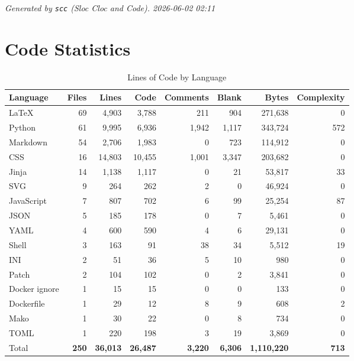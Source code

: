 
\textit{Generated by \texttt{scc} (Sloc Cloc and Code). 2026-06-02 02:11}
\section{Code Statistics}

\begin{table}[H]
  \centering
  \caption{Lines of Code by Language}
  \label{tab:scc-report}
  \begin{tabular}{|l|r|r|r|r|r|r|r|}
    \hline
    \textbf{Language} & \textbf{Files} & \textbf{Lines} & \textbf{Code} & \textbf{Comments} & \textbf{Blank} & \textbf{Bytes} & \textbf{Complexity} \\
    \hline
    LaTeX & 69 & 4,903 & 3,788 & 211 & 904 & 271,638 & 0 \\\hline
    Python & 61 & 9,995 & 6,936 & 1,942 & 1,117 & 343,724 & 572 \\\hline
    Markdown & 54 & 2,706 & 1,983 & 0 & 723 & 114,912 & 0 \\\hline
    CSS & 16 & 14,803 & 10,455 & 1,001 & 3,347 & 203,682 & 0 \\\hline
    Jinja & 14 & 1,138 & 1,117 & 0 & 21 & 53,817 & 33 \\\hline
    SVG & 9 & 264 & 262 & 2 & 0 & 46,924 & 0 \\\hline
    JavaScript & 7 & 807 & 702 & 6 & 99 & 25,254 & 87 \\\hline
    JSON & 5 & 185 & 178 & 0 & 7 & 5,461 & 0 \\\hline
    YAML & 4 & 600 & 590 & 4 & 6 & 29,131 & 0 \\\hline
    Shell & 3 & 163 & 91 & 38 & 34 & 5,512 & 19 \\\hline
    INI & 2 & 51 & 36 & 5 & 10 & 980 & 0 \\\hline
    Patch & 2 & 104 & 102 & 0 & 2 & 3,841 & 0 \\\hline
    Docker ignore & 1 & 15 & 15 & 0 & 0 & 133 & 0 \\\hline
    Dockerfile & 1 & 29 & 12 & 8 & 9 & 608 & 2 \\\hline
    Mako & 1 & 30 & 22 & 0 & 8 & 734 & 0 \\\hline
    TOML & 1 & 220 & 198 & 3 & 19 & 3,869 & 0 \\\hline
    Total & \textbf{250} & \textbf{36,013} & \textbf{26,487} & \textbf{3,220} & \textbf{6,306} & \textbf{1,110,220} & \textbf{713} \\
    \hline
  \end{tabular}
\end{table}


